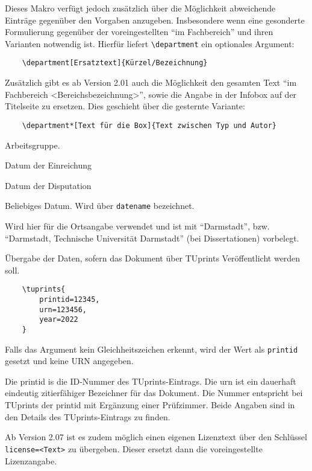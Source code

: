 \documentclass[
	german,%
	ruledheaders=section,%
	class=report,%
	thesis={type=bachelor},%
	accentcolor=9c,%
	custommargins=true,%
	marginpar=false,%
	parskip=half-,%
	fontsize=11pt,%
]{tudapub}
\let\code\texttt
\begin{document}
\begin{description}
	      Dieses Makro verfügt jedoch zusätzlich über die Möglichkeit abweichende Einträge gegenüber den Vorgaben anzugeben. Insbesondere wenn eine gesonderte Formulierung gegenüber der voreingestellten \enquote{im Fachbereich} und ihren Varianten notwendig ist. Hierfür liefert \code{\textbackslash{}department} ein optionales Argument:

\begin{verbatim}
    \department[Ersatztext]{Kürzel/Bezeichnung}
\end{verbatim}
	      Zusätzlich gibt es ab Version 2.01 auch die Möglichkeit den gesamten Text \enquote{im Fachbereich <Bereichsbezeichnung>}, sowie die Angabe in der Infobox auf der Titelseite zu ersetzen. Dies geschieht über die gesternte Variante:
\begin{verbatim}
    \department*[Text für die Box]{Text zwischen Typ und Autor}
\end{verbatim}
	\item[group] Arbeitsgruppe.
	\item[submissiondate] Datum der Einreichung
	\item[examdate] Datum der Disputation
	\item[date] Beliebiges Datum. Wird über \verb|datename| bezeichnet.
	\item[publishers] Wird hier für die Ortsangabe verwendet und ist mit \enquote{Darmstadt}, bzw. \enquote{Darmstadt, Technische Universität Darmstadt} (bei Dissertationen) vorbelegt.
	\item[tuprints] \label{page:tuprints}Übergabe der Daten, sofern das Dokument über TUprints Veröffentlicht werden soll.
\begin{verbatim}
    \tuprints{
        printid=12345,
        urn=123456,
        year=2022
    }
\end{verbatim}
	      Falls das Argument kein Gleichheitszeichen erkennt, wird der Wert als \code{printid} gesetzt und keine URN angegeben.

	      Die printid is die ID-Nummer des TUprints-Eintrags. Die urn ist ein dauerhaft eindeutig zitierfähiger Bezeichner für das Dokument. Die Nummer entspricht bei TUprints der printid mit Ergänzung einer Prüfzimmer. Beide Angaben sind in den Details des TUprints-Eintrags zu finden.

	      Ab Version 2.07 ist es zudem möglich einen eigenen Lizenztext über den Schlüssel \verb|license=<Text>| zu übergeben. Dieser ersetzt dann die voreingestellte Lizenzangabe.


\end{description}
\end{document}
